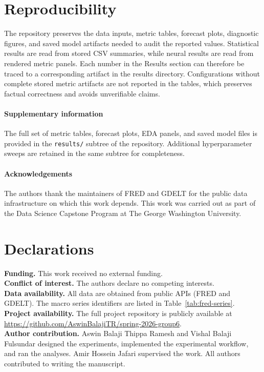 \documentclass[11pt,a4paper]{article}
\newcommand{\bmhead}[1]{\paragraph{\textbf{#1}}}
\newcommand{\backmatter}{}
\begin{document}
\section{Reproducibility}\label{sec:reproducibility}

The repository preserves the data inputs, metric tables, forecast plots, diagnostic figures, and saved model artifacts needed to audit the reported values. Statistical results are read from stored CSV summaries, while neural results are read from rendered metric panels. Each number in the Results section can therefore be traced to a corresponding artifact in the results directory. Configurations without complete stored metric artifacts are not reported in the tables, which preserves factual correctness and avoids unverifiable claims.

\backmatter

\bmhead{Supplementary information}
The full set of metric tables, forecast plots, EDA panels, and saved model files is provided in the \texttt{results/} subtree of the repository. Additional hyperparameter sweeps are retained in the same subtree for completeness.

\bmhead{Acknowledgements}
The authors thank the maintainers of FRED and GDELT for the public data infrastructure on which this work depends. This work was carried out as part of the Data Science Capstone Program at The George Washington University.

\section*{Declarations}

\noindent\textbf{Funding.} This work received no external funding.\\
\textbf{Conflict of interest.} The authors declare no competing interests.\\
\textbf{Data availability.} All data are obtained from public APIs (FRED and GDELT). The macro series identifiers are listed in Table~\ref{tab:fred-series}.\\
\textbf{Project availability.} The full project repository is publicly available at \url{https://github.com/AswinBalajiTR/spring-2026-group6}.\\
\textbf{Author contribution.} Aswin Balaji Thippa Ramesh and Vishal Balaji Fulsundar designed the experiments, implemented the experimental workflow, and ran the analyses. Amir Hossein Jafari supervised the work. All authors contributed to writing the manuscript.
\end{document}
